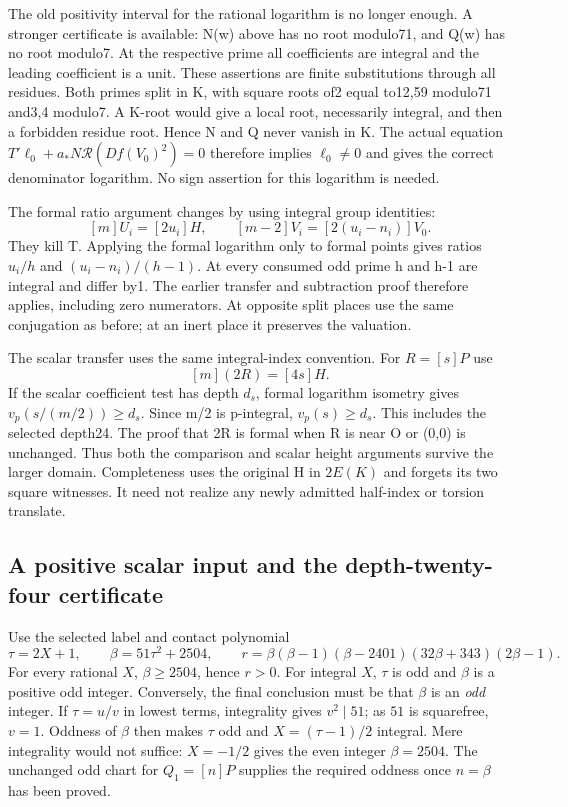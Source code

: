 The old positivity interval for the rational logarithm is no longer
enough. A stronger certificate is available: N(w) above has no root
modulo71, and Q(w) has no root modulo7. At the respective prime all
coefficients are integral and the leading coefficient is a unit.
These assertions are finite substitutions through all residues. Both
primes split in K, with square roots of2 equal to12,59 modulo71
and3,4 modulo7. A K-root would give a local root, necessarily integral,
and then a forbidden residue root. Hence N and Q never vanish in K.
The actual equation $T'\ell_0+a_*N\mathcal R(Df(V_0)^2)=0$
therefore implies $\ell_0\ne0$ and gives the correct denominator
logarithm. No sign assertion for this logarithm is needed.

The formal ratio argument changes by using integral group identities:
\[
 [m]U_i=[2u_i]H,\qquad
 [m-2]V_i=[2(u_i-n_i)]V_0.
\]
They kill T. Applying the formal logarithm only to formal points
gives ratios $u_i/h$ and $(u_i-n_i)/(h-1)$. At every consumed odd
prime h and h-1 are integral and differ by1. The earlier transfer
and subtraction proof therefore applies, including zero numerators.
At opposite split places use the same conjugation as before; at an
inert place it preserves the valuation.

The scalar transfer uses the same integral-index convention. For $R=[s]P$ use
\[
                    [m](2R)=[4s]H.
\]
If the scalar coefficient test has depth $d_s$, formal logarithm
isometry gives $v_p(s/(m/2))\ge d_s$. Since m/2 is p-integral,
$v_p(s)\ge d_s$. This includes the selected depth24. The proof
that 2R is formal when R is near O or (0,0) is unchanged. Thus
both the comparison and scalar height arguments survive the larger
domain. Completeness uses the original H in $2E(K)$ and forgets its
two square witnesses. It need not realize any newly admitted half-index
or torsion translate.

\subsection{A positive scalar input and the depth-twenty-four certificate}
Use the selected label and contact polynomial
\[
 \tau=2X+1,\qquad \beta=51\tau^2+2504,
 \qquad r=\beta(\beta-1)(\beta-2401)(32\beta+343)(2\beta-1).
\]
For every rational $X$, $\beta\ge2504$, hence $r>0$.
For integral $X$, $\tau$ is odd and $\beta$ is a positive odd integer.
Conversely, the final conclusion must be that $\beta$ is an \emph{odd}
integer. If $\tau=u/v$ in lowest terms, integrality gives $v^2\mid51$;
as $51$ is squarefree, $v=1$. Oddness of $\beta$ then makes $\tau$ odd
and $X=(\tau-1)/2$ integral. Mere integrality would not suffice:
$X=-1/2$ gives the even integer $\beta=2504$.
The unchanged odd chart for $Q_1=[n]P$ supplies the required oddness
once $n=\beta$ has been proved.

